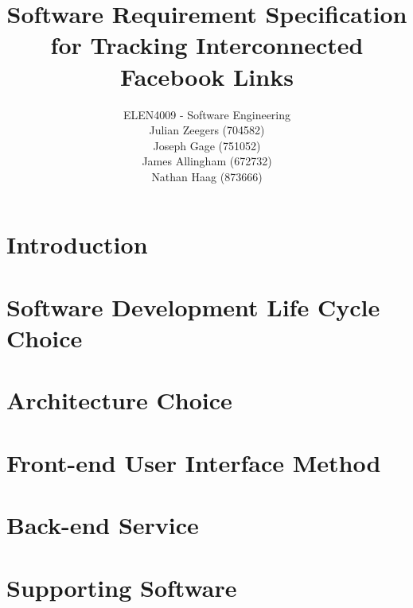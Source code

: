 \documentclass[10pt,onecolumn]{article}
\title{\vspace{-4.2cm}Software Requirement Specification for Tracking Interconnected Facebook Links }
\author{ ELEN4009 - Software Engineering\\ Julian Zeegers (704582) \\  Joseph Gage (751052)\\ James Allingham (672732) \\ Nathan Haag (873666)}
\begin{document}
\date{\vspace{-5ex}}
\maketitle
\pagestyle{plain}
\setcounter{page}{1}



\section{Introduction}
 

\section{Software Development Life Cycle Choice}



\section{Architecture Choice}

\section{Front-end User Interface Method}
\section{Back-end Service}
\section{Supporting Software}


\begin{thebibliography}{1}

	
	
\end{thebibliography}

\clearpage
\end{document}
